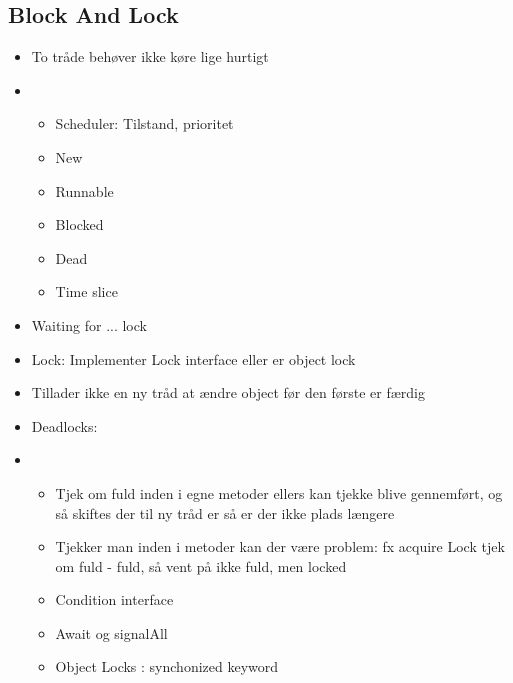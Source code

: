 \subsection{Block And Lock} %
\label{sub:block_and_lock}
\begin{itemize}
    \item To tråde behøver ikke køre lige hurtigt
    \item \begin{itemize}
        \item Scheduler: Tilstand, prioritet
        \item New
        \item Runnable
        \item Blocked
        \item Dead
        \item Time slice
    \end{itemize}
    \item Waiting for ... lock
    \item Lock: Implementer Lock interface eller er object lock
    \item Tillader ikke en ny tråd at ændre object før den første er færdig
    \item Deadlocks:
    \item \begin{itemize}
        \item Tjek om fuld inden i egne metoder ellers kan tjekke blive gennemført, og så skiftes der til ny tråd er så er der ikke plads længere
        \item Tjekker man inden i metoder kan der være problem: fx acquire Lock tjek om fuld - fuld, så vent på ikke fuld, men locked
        \item Condition interface
        \item Await og signalAll
        \item Object Locks : synchonized keyword
    \end{itemize}
\end{itemize}



